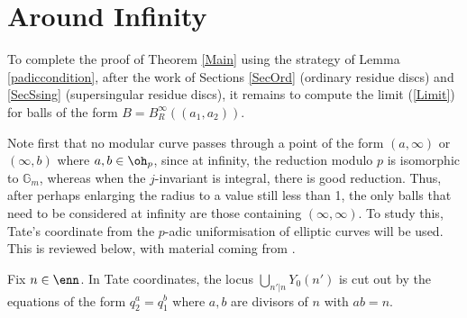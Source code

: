 \documentclass[12pt,letterpaper]{article}
\begin{document}
	
	
	
	
	\section{Around Infinity}\label{infinity}
	
	To complete the proof of Theorem \ref{Main} using the strategy of Lemma \ref{padiccondition}, after the work of Sections \ref{SecOrd} (ordinary residue discs) and \ref{SecSsing} (supersingular residue discs), it remains to compute the limit (\ref{Limit}) for balls of the form $B=B^\infty_R((a_1,a_2))$.
	
	Note first that no modular curve passes through a point of the form $(a,\infty)$ or $(\infty,b)$ where $a,b\in \oh_p$, since at infinity, the reduction modulo $p$ is isomorphic to $\mathbb{G}_m$, whereas when the $j$-invariant is integral, there is good reduction. Thus, after perhaps enlarging the radius to a value still less than 1, the only balls that need to be considered at infinity are those containing $(\infty,\infty)$. To study this, Tate's coordinate from the $p$-adic uniformisation of elliptic curves will be used. This is reviewed below, with material coming from \cite{Sil94}.
	
	
	
	
	
	
	\begin{lemma}
		Fix $n\in \enn$. In Tate coordinates, the locus $\bigcup_{n'|n}Y_0(n')$ is cut out by the equations of the form $q_2^a=q_1^b$ where $a,b$ are divisors of $n$ with $ab=n$.
	\end{lemma}
	
\end{document}
